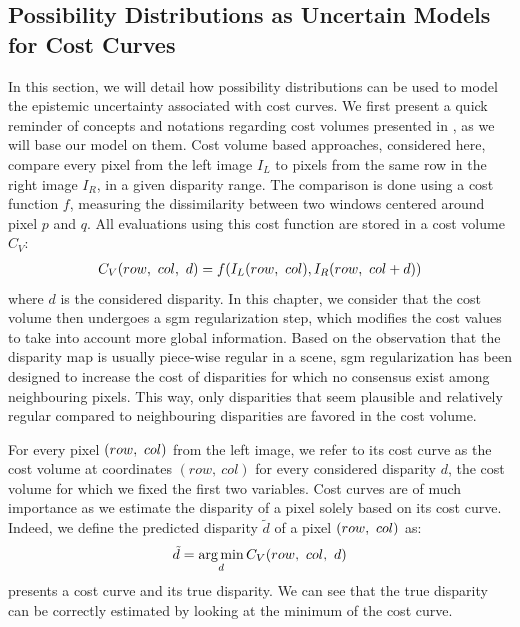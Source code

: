 \subsection{Possibility Distributions as Uncertain Models for Cost Curves}
In this section, we will detail how possibility distributions can be used to model the epistemic uncertainty associated with cost curves. We first present a quick reminder of concepts and notations regarding cost volumes presented in , as we will base our model on them. Cost volume based approaches, considered here, compare every pixel from the left image $I_L$ to pixels from the same row in the right image $I_R$, in a given disparity range. The comparison is done using a cost function $f$, measuring the dissimilarity between two windows centered around pixel $p$ and $q$. All evaluations using this cost function are stored in a cost volume $C_V$:
\begin{align}
	C_V(row, ~col, ~d) = f(I_L(row, ~col), I_R(row, ~col+d))
\end{align}
where $d$ is the considered disparity. In this chapter, we consider that the cost volume then undergoes a \acrshort{sgm} regularization step, which modifies the cost values to take into account more global information. Based on the observation that the disparity map is usually piece-wise regular in a scene, \acrshort{sgm} regularization has been designed to increase the cost of disparities for which no consensus exist among neighbouring pixels. This way, only disparities that seem plausible and relatively regular compared to neighbouring disparities are favored in the cost volume.

For every pixel $(row, ~col)$ from the left image, we refer to its cost curve as the cost volume at coordinates $(row,~col)$ for every considered disparity $d$, \ie the cost volume for which we fixed the first two variables. Cost curves are of much importance as we estimate the disparity of a pixel solely based on its cost curve. Indeed, we define the predicted disparity $\tilde{d}$ of a pixel $(row, ~col)$ as:
\begin{align}
	\tilde{d} = \operatorname*{arg\,min}_d C_V(row, ~col, ~d)
\end{align} 
 presents a cost curve and its true disparity. We can see that the true disparity can be correctly estimated by looking at the minimum of the cost curve.

